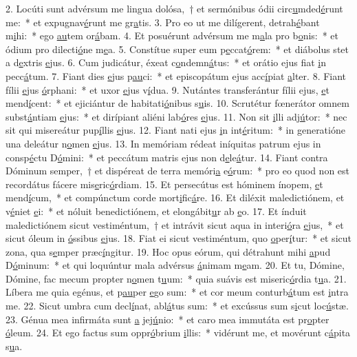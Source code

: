 2. Locúti sunt advérsum me lingua dolósa,~† et sermónibus ódii circ\uline{u}mded\uline{é}runt me:~* et expugnav\uline{é}runt me gr\uline{a}tis.
3. Pro eo ut me dilígerent, detrah\uline{é}bant m\uline{i}hi:~* ego \uline{au}tem or\uline{á}bam.
4. Et posuérunt advérsum me m\uline{a}la pro b\uline{o}nis:~* et ódium pro dilecti\uline{ó}ne m\uline{e}a.
5. Constítue super eum p\uline{e}ccat\uline{ó}rem:~* et diábolus stet a d\uline{e}xtris \uline{e}jus.
6. Cum judicátur, éxeat c\uline{o}ndemn\uline{á}tus:~* et orátio ejus fiat \uline{i}n pecc\uline{á}tum.
7. Fiant dies \uline{e}jus p\uline{au}ci:~* et episcopátum ejus acc\uline{í}piat \uline{a}lter.
8. Fiant fílii \uline{e}jus \uline{ó}rphani:~* et uxor \uline{e}jus v\uline{í}dua.
9. Nutántes transferántur fílii ejus, \uline{e}t mend\uline{í}cent:~* et ejiciántur de habitati\uline{ó}nibus s\uline{u}is.
10. Scrutétur fœnerátor omnem subst\uline{á}ntiam \uline{e}jus:~* et dirípiant aliéni lab\uline{ó}res \uline{e}jus.
11. Non sit \uline{i}lli adj\uline{ú}tor:~* nec sit qui misereátur pup\uline{í}llis \uline{e}jus.
12. Fiant nati ejus \uline{i}n int\uline{é}ritum:~* in generatióne una deleátur n\uline{o}men \uline{e}jus.
13. In memóriam rédeat iníquitas patrum ejus in consp\uline{é}ctu D\uline{ó}mini:~* et peccátum matris ejus non d\uline{e}le\uline{á}tur.
14. Fiant contra Dóminum semper,~† et dispéreat de terra memóri\uline{a} e\uline{ó}rum:~* pro eo quod non est recordátus fácere mis\uline{e}ric\uline{ó}rdiam.
15. Et persecútus est hóminem ínopem, \uline{e}t mend\uline{í}cum,~* et compúnctum corde mort\uline{i}fic\uline{á}re.
16. Et diléxit maledictiónem, et v\uline{é}niet \uline{e}i:~* et nóluit benedictiónem, et elongábit\uline{u}r ab \uline{e}o.
17. Et índuit maledictiónem sicut vestiméntum,~† et intrávit sicut aqua in interi\uline{ó}ra \uline{e}jus,~* et sicut óleum in \uline{ó}ssibus \uline{e}jus.
18. Fiat ei sicut vestiméntum, quo \uline{o}per\uline{í}tur:~* et sicut zona, qua s\uline{e}mper præc\uline{í}ngitur.
19. Hoc opus eórum, qui détrahunt mihi \uline{a}pud D\uline{ó}minum:~* et qui loquúntur mala advérsus \uline{á}nimam m\uline{e}am.
20. Et tu, Dómine, Dómine, fac mecum propter n\uline{o}men t\uline{u}um:~* quia suávis est miseric\uline{ó}rdia t\uline{u}a.
21. Líbera me quia egénus, et p\uline{au}per \uline{e}go sum:~* et cor meum conturb\uline{á}tum est \uline{i}ntra me.
22. Sicut umbra cum decl\uline{í}nat, abl\uline{á}tus sum:~* et excússus sum s\uline{i}cut loc\uline{ú}stæ.
23. Génua mea infirmáta sunt \uline{a} jej\uline{ú}nio:~* et caro mea immutáta est pr\uline{o}pter \uline{ó}leum.
24. Et ego factus sum oppr\uline{ó}brium \uline{i}llis:~* vidérunt me, et movérunt c\uline{á}pita s\uline{u}a.
